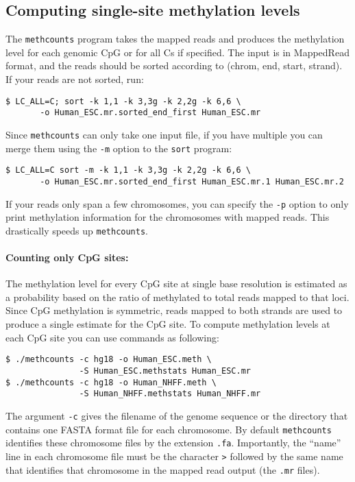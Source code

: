 \documentclass[10pt]{article}
\newcommand{\prog}[1]{\texttt{#1}}
\newcommand{\fn}[1]{\texttt{#1}}
\newcommand{\lit}[1]{\texttt{#1}}
\newcommand{\op}[1]{\texttt{#1}}
\begin{document}
\subsection{Computing single-site methylation levels}
\label{sec:estim-methyl-freq}

The \prog{methcounts} program takes the mapped reads and produces the
methylation level for each genomic CpG or for all Cs if specified.
The input is in MappedRead format, and the reads should be sorted
according to (chrom, end, start, strand). If your reads are not
sorted, run:
\begin{verbatim}
$ LC_ALL=C; sort -k 1,1 -k 3,3g -k 2,2g -k 6,6 \
       -o Human_ESC.mr.sorted_end_first Human_ESC.mr
\end{verbatim}
Since \prog{methcounts} can only take one input file, if you have
multiple you can merge them using the \op{-m} option to the
\prog{sort} program:
\begin{verbatim}
$ LC_ALL=C sort -m -k 1,1 -k 3,3g -k 2,2g -k 6,6 \
       -o Human_ESC.mr.sorted_end_first Human_ESC.mr.1 Human_ESC.mr.2
\end{verbatim}

If your reads only span a few chromosomes, you can specify the \op{-p}
option to only print methylation information for the chromosomes with
mapped reads.  This drastically speeds up \prog{methcounts}.

\paragraph{Counting only CpG sites:}
The methylation level for every CpG site at single base resolution is
estimated as a probability based on the ratio of methylated to total
reads mapped to that loci. Since CpG methylation is symmetric, reads
mapped to both strands are used to produce a single estimate for the
CpG site. To compute methylation levels at each CpG site you can use
commands as following:
\begin{verbatim}
$ ./methcounts -c hg18 -o Human_ESC.meth \
               -S Human_ESC.methstats Human_ESC.mr
$ ./methcounts -c hg18 -o Human_NHFF.meth \
               -S Human_NHFF.methstats Human_NHFF.mr
\end{verbatim}
The argument \op{-c} gives the filename of the genome sequence or the
directory that contains one FASTA format file for each chromosome. By
default \prog{methcounts} identifies these chromosome files by the
extension \fn{.fa}. Importantly, the ``name'' line in each chromosome
file must be the character \lit{>} followed by the same name that
identifies that chromosome in the mapped read output (the \fn{.mr}
files).
\end{document}
